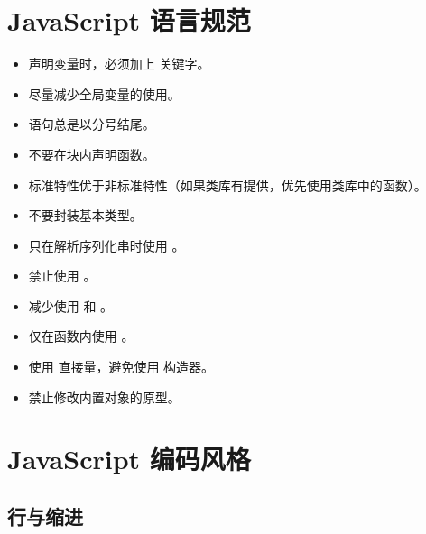 \documentclass[letterpaper,10pt,english]{sphinxmanual}
\begin{document}
\section{JavaScript 语言规范}
\label{styleguide/js-lang-rules:styleguide-jslangrules}\label{styleguide/js-lang-rules:javascript}\label{styleguide/js-lang-rules::doc}\begin{itemize}
\item {}
声明变量时，必须加上  关键字。

\item {}
尽量减少全局变量的使用。

\item {}
语句总是以分号结尾。

\item {}
不要在块内声明函数。

\item {}
标准特性优于非标准特性（如果类库有提供，优先使用类库中的函数）。

\item {}
不要封装基本类型。

\item {}
只在解析序列化串时使用  。

\item {}
禁止使用  。

\item {}
减少使用  和  。

\item {}
仅在函数内使用  。

\item {}
使用  直接量，避免使用  构造器。

\item {}
禁止修改内置对象的原型。

\end{itemize}


\section{JavaScript 编码风格}
\label{styleguide/js-style-rules:styleguide-jsstylerules}\label{styleguide/js-style-rules:javascript}\label{styleguide/js-style-rules::doc}

\subsection{行与缩进}
\label{styleguide/js-style-rules:id1}
\end{document}
